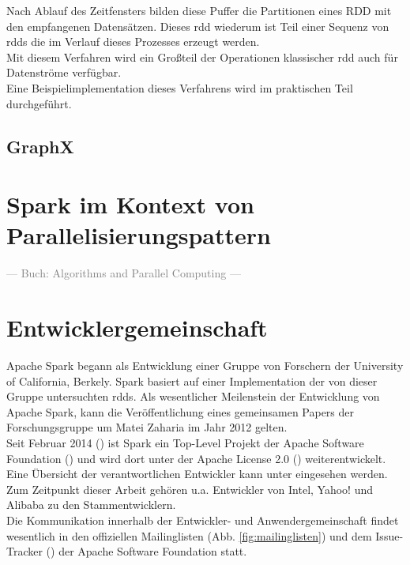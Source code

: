Nach Ablauf des Zeitfensters bilden diese Puffer die Partitionen eines RDD mit den empfangenen Datensätzen. Dieses \gls{rdd} wiederum ist Teil einer Sequenz von \glspl{rdd} die im Verlauf dieses Prozesses erzeugt werden.\\

Mit diesem Verfahren wird ein Großteil der Operationen klassischer \gls{rdd} auch für Datenströme verfügbar.\\

Eine Beispielimplementation dieses Verfahrens wird im praktischen Teil durchgeführt.

\subsection{GraphX}
\cite{Gonzalez:2014:GGP:2685048.2685096}

\section{Spark im Kontext von Parallelisierungspattern}
\textcolor{gray}{--- Buch: Algorithms and Parallel Computing ---}\\

\section{Entwicklergemeinschaft}

Apache Spark begann als Entwicklung einer Gruppe von Forschern der University of California, Berkely. Spark basiert auf einer Implementation der von dieser Gruppe untersuchten \glspl{rdd}\cite{Mat12}. Als wesentlicher Meilenstein der Entwicklung von Apache Spark, kann die Veröffentlichung eines gemeinsamen Papers der Forschungsgruppe um Matei Zaharia im Jahr 2012 gelten.\\

Seit Februar 2014 (\cite{apacheblog}) ist Spark ein Top-Level Projekt der Apache Software Foundation (\cite{apache}) und wird dort unter der Apache License 2.0 (\cite{apachelic}) weiterentwickelt.\\

Eine Übersicht der verantwortlichen Entwickler kann unter \cite{committer} eingesehen werden.
Zum Zeitpunkt dieser Arbeit gehören u.a. Entwickler von Intel, Yahoo! und Alibaba zu den Stammentwicklern.\\

Die Kommunikation innerhalb der Entwickler- und Anwendergemeinschaft findet wesentlich in den offiziellen Mailinglisten (Abb. \ref{fig:mailinglisten}) und dem Issue-Tracker (\cite{issuetracker}) der Apache Software Foundation statt.

